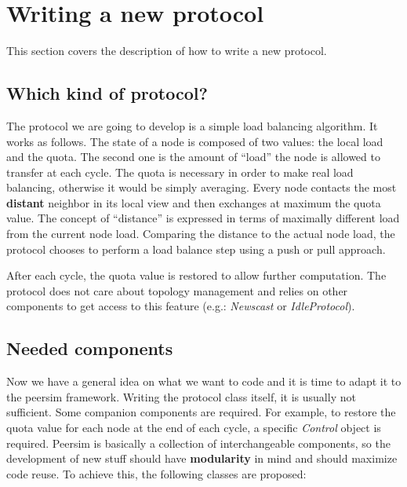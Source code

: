 \documentclass[a4paper,11pt]{article}
\begin{document}
\section{Writing a new protocol}


This section covers the description of how to write a new protocol. 


\subsection{Which kind of protocol?}

The protocol we are going to develop is a simple load balancing algorithm.
It works as follows. The state of a node is composed of two values:
the local load and the quota. The second one is the amount of ``load''
the node is allowed to transfer at each cycle. The quota is necessary
in order to make real load balancing, otherwise it would be simply
averaging. Every node contacts the most \textbf{distant} neighbor
in its local view and then exchanges at maximum the quota value. The
concept of ``distance'' is expressed in terms of maximally
different load from the current node load. Comparing the distance
to the actual node load, the protocol chooses to perform a load balance
step using a push or pull approach.

After each cycle, the quota value is restored to allow further computation.
The protocol does not care about topology management and relies on
other components to get access to this feature (e.g.: \emph{Newscast} or
\emph{IdleProtocol}). 


\subsection{Needed components}

Now we have a general idea on what we want to code and it is time to
adapt it to the peersim framework. Writing the protocol class itself,
it is usually not sufficient. Some companion components are required.
For example, to restore the quota value for each node at the end of
each cycle, a specific \emph{Control} object is required. Peersim
is basically a collection of interchangeable components, so the development
of new stuff should have \textbf{modularity} in mind and should maximize
code reuse. To achieve this, the following classes are proposed:
\end{document}
